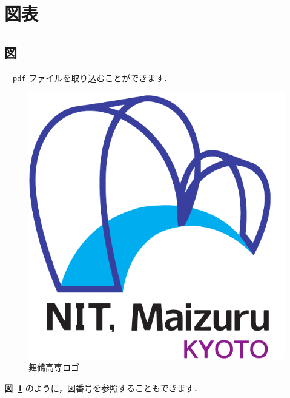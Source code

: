 
\section{図表}
\subsection{図}
　\texttt{pdf} ファイルを取り込むことができます．
\begin{figure}[H]
\centering
	\includegraphics[scale=0.5]{logo.pdf}
	\caption{舞鶴高専ロゴ}
	\label{fig:fig01}
\end{figure}
\textbf{図~\ref{fig:fig01}} のように，図番号を参照することもできます．


